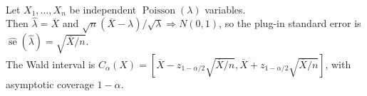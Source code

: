 \begin{example} \label{ex:poisson-mle-wald-confidence-interval} \\
Let $X_1,\ldots,X_n$ be independent $\operatorname{Poisson}(\lambda)$ variables.\\
Then $\widehat{\lambda}=\overline{X}$ and $\sqrt n(\overline{X}-\lambda)/\sqrt{\lambda}\Rightarrow N(0,1)$, so the plug-in standard error is $\widehat{\operatorname{se}}(\widehat{\lambda})=\sqrt{\overline{X}/n}$.\\
The Wald interval is $C_\alpha(X)=[\overline{X}-z_{1-\alpha/2}\sqrt{\overline{X}/n},\overline{X}+z_{1-\alpha/2}\sqrt{\overline{X}/n}]$, with asymptotic coverage $1-\alpha$.
\end{example}
